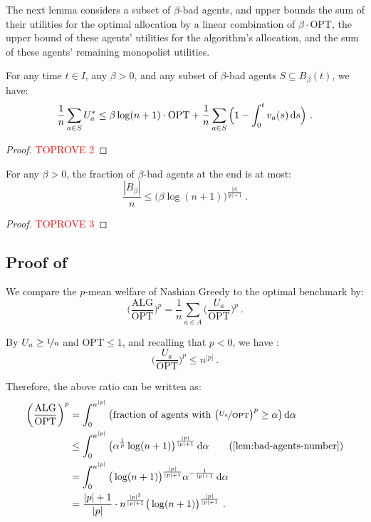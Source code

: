 \documentclass[11pt,letterpaper]{article}
\newcommand{\OPT}{\mathrm{OPT}}
\newcommand{\ALG}{\mathrm{ALG}}
\newcommand{\dif}[1]{\,\text{\rm d} #1}
\newcommand{\utility}{U}
\begin{document}
The next lemma considers a subset of $\beta$-bad agents, and upper bounds the sum of their utilities for the optimal allocation by a linear combination of $\beta \cdot \OPT$, the upper bound of these agents' utilities for the algorithm's allocation, and the sum of these agents' remaining monopolist utilities.

\begin{lemma}
	\label{lem:bad-agents-optimal-utility}
	For any time $t\in I$, any $\beta > 0$, and any subset of $\beta$-bad agents $S \subseteq B_\beta(t)$, we have:
	\[
		\frac{1}{n} \sum_{a\in S} \utility_a^* 
		\leq \beta \log (n+1) \cdot \OPT + \frac{1}{n} \sum_{a\in S} \Big(1-\int_0^t v_a(s) \dif{s} \Big)
	~.
	\]
\end{lemma}

\begin{proof}\textcolor{red}{TOPROVE 2}\end{proof}

\begin{lemma}
	\label{lem:bad-agents-number}	
	For any $\beta > 0$, the fraction of $\beta$-bad agents at the end is at most:
	\[
		\frac{|B_\beta|}{n} \le \big( \beta \log (n+1) \big)^{\frac{|p|}{|p|+1}}
		~.
	\]
\end{lemma}

\begin{proof}\textcolor{red}{TOPROVE 3}\end{proof}



\subsection{Proof of }

We compare the $p$-mean welfare of Nashian Greedy to the optimal benchmark by:
\[
	\bigg( \frac{\ALG}{\OPT} \bigg)^p = \frac{1}{n} \sum_{a\in A} \bigg( \frac{\utility_a}{\OPT} \bigg)^p
	~.
\]

By $\utility_a \ge \nicefrac{1}{n}$ and $\OPT \le 1$, and recalling that $p < 0$, we have :
\[
	\bigg(\frac{\utility_a}{\OPT}\bigg)^p \le n^{|p|}
	~.
\]

Therefore, the above ratio can be written as:
\begin{align*}
	\bigg( \frac{\ALG}{\OPT} \bigg)^p
	& = \int_0^{n^{|p|}} \big(\text{fraction of agents with $\big( \nicefrac{\utility_a}{\OPT} \big)^p \ge \alpha$}\big) \dif{\alpha} \\
	&
	\le \int_0^{n^{|p|}} \big( \alpha^{\frac{1}{p}} \log(n+1) \big)^{\frac{|p|}{|p|+1}} \dif{\alpha} 
	\tag{\Cref{lem:bad-agents-number}} \\
	&
	= \int_0^{n^{|p|}} \big( \log(n+1) \big)^{\frac{|p|}{|p|+1}} \alpha^{-\frac{1}{|p|+1}} \dif{\alpha} \\
	&
	= \frac{|p|+1}{|p|} \cdot n^{\frac{|p|^2}{|p|+1}} \big(\log(n+1) \big)^{\frac{|p|}{|p|+1}}
	~.
\end{align*}
\end{document}
